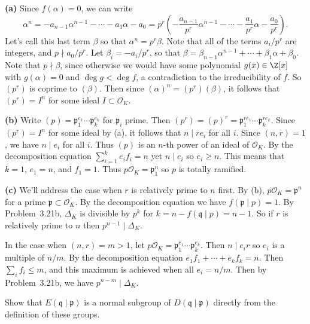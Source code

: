 \documentclass[11pt,letterpaper]{article}
\begin{document}
\begin{solution}
    \textbf{(a)} Since $f(\alpha)=0$, we can write
    \[
        \alpha^n=-a_{n-1}\alpha^{n-1}-\cdots-a_1\alpha-a_0=p^r\left(-\frac{a_{n-1}}{p^r}\alpha^{n-1}-\cdots-\frac{a_1}{p^r}\alpha-\frac{a_0}{p^r}\right)
    .\]   
    Let's call this last term $\beta$ so that $\alpha^n=p^r\beta$. Note that all of the terms $a_{i}/p^r$ are integers, and $p\nmid a_0/p^r$. Let $\beta_i = -a_i /p^r$, so that $\beta = \beta_{n-1}\alpha^{n-1}+\cdots+\beta_1\alpha+\beta_0$. Note that $p\nmid \beta$, since otherwise we would have some polynomial $g(x)\in \Z[x]$ with $g(\alpha)=0$ and $\deg g < \deg f$, a contradiction to the irreducibility of $f$. So $(p^r)$ is coprime to $(\beta)$. Then since $(\alpha)^n=(p^r)(\beta)$, it follows that $(p^r)=I^n$ for some ideal $I\subset \mathcal{O}_K$. 
    
    \textbf{(b)} Write $(p)=\mathfrak{p}^{e_1}_1\cdots \mathfrak{p}^{e_k}_k$ for $\mathfrak{p}_i$ prime. Then $(p^r)=(p)^r=\mathfrak{p}^{re_1}_1\cdots \mathfrak{p}^{re_k}_k$. Since $(p^r)=I^n$ for some ideal by (a), it follows that $n\mid re_i$ for all $i$. Since $(n,r)=1$, we have $n\mid e_i$ for all $i$. Thus $(p)$ is an $n$-th power of an ideal of $\mathcal{O}_K$. By the decomposition equation $\sum_{i=1}^k e_if_i=n$ yet $n\mid e_i$ so $e_i\geq n$. This means that $k=1$, $e_1=n$, and $f_1=1$. Thus $p\mathcal{O}_K=\mathfrak{p}_1^n$ so $p$ is totally ramified.
    
    \textbf{(c)} We'll address the case when $r$ is relatively prime to $n$ first. By (b), $p\mathcal{O}_K=\mathfrak{p}^n$ for a prime $\mathfrak{p}\subset \mathcal{O}_K$. By the decomposition equation we have $f(\mathfrak{p}\mid p)=1$. By Problem~3.21b, $\Delta_K$ is divisible by $p^k$ for $k=n-f(\mathfrak{q}\mid p) = n-1$. So if $r$ is relatively prime to $n$ then $p^{n-1}\mid \Delta_K$.
    
    In the case when $(n,r)=m>1$, let $p\mathcal{O}_K=\mathfrak{p}^{e_1}_1\cdots \mathfrak{p}_k^{e_k}$. Then $n\mid e_i r$ so $e_i$ is a multiple of $n /m$. By the decomposition equation $e_1f_1+\cdots+e_kf_k=n$. Then $\sum_i f_i \leq m$, and this maximum is achieved when all $e_i=n /m$. Then by Problem~3.21b, we have $p^{n-m}\mid \Delta_K$. 
\end{solution}

\begin{cproblem}{4.1}
    Show that $E(\mathfrak{q}\mid \mathfrak{p})$ is a normal subgroup of $D(\mathfrak{q}\mid \mathfrak{p})$ directly from the definition of these groups.
\end{cproblem}
\end{document}
